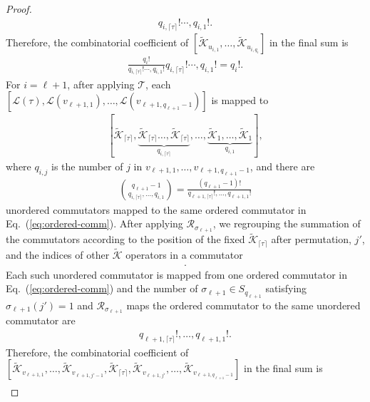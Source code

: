 \documentclass[11pt]{article}
\newcommand{\eq}[1]{(\ref{eq:#1})}
\newcommand{\mc}{\mathcal}
\begin{document}
\begin{proof}
\begin{align*}
    q_{i, \lceil\tau\rceil}! \cdots, q_{i,1}!.
\end{align*}
Therefore, the combinatorial coefficient of $[\tilde{\mc K}_{u_{i,1}},\ldots, \tilde{\mc K}_{u_{i,q_i}}]$ in the final sum is  \begin{align*}
    \frac{q_i!}{q_{i, \lceil\tau\rceil}! \cdots, q_{i,1}!}q_{i, \lceil\tau\rceil}! \cdots, q_{i,1}! = q_i!.
\end{align*}
For $i= \ell+1$, after applying $\mc T$, each $[\mc L(\tau), \mc L(v_{\ell+1,1}), \ldots, \mc L(v_{\ell+1,q_{\ell+1}-1})]$ is mapped to \begin{align}
\label{eq:ordered-comm}
    [\tilde{\mc K}_{\lceil \tau \rceil},\underbrace{\tilde{\mc K}_{\lceil\tau\rceil} \ldots,\tilde{\mc K}_{\lceil\tau\rceil}}_{q_{i,\lceil\tau\rceil}},   \ldots, \underbrace{\tilde{\mc K}_{1},  \ldots, \tilde{\mc K}_{1}}_{q_{i,1}}],
\end{align}
where $q_{i,j}$ is the number of $j$ in $v_{\ell+1, 1},\ldots, v_{\ell+1, q_{\ell+1}-1}$, and there are \begin{align*}
    \binom{q_{\ell+1}-1}{q_{i,\lceil \tau \rceil}, \ldots, q_{i,1}} = \frac{(q_{\ell+1}-1)!}{q_{\ell+1,\lceil \tau \rceil}!, \ldots, q_{\ell+1,1}!}
\end{align*} unordered commutators mapped to the same ordered commutator in Eq.~\eq{ordered-comm}. After applying $\mc R_{\sigma_{\ell+1}}$, we regrouping the summation of the commutators according to the position of the fixed $\tilde{\mc K}_{\lceil \tau \rceil}$ after permutation, $j'$, and the indices of other $\tilde{\mc K}$ operators in a commutator \begin{align*}
    [\tilde{\mc K}_{v_{\ell+1,1}}, \ldots,\tilde{\mc K}_{\lceil\tau\rceil}, \ldots, \tilde{\mc K}_{v_{\ell+1,q_{\ell+1}-1}}].
\end{align*} Each such unordered commutator is mapped from one ordered commutator in Eq.~\eq{ordered-comm} and the number of $\sigma_{\ell+1}\in S_{q_{\ell+1}}$ satisfying $\sigma_{\ell+1}(j')=1$ and $\mc R_{\sigma_{\ell+1}}$ maps the ordered commutator to the same unordered commutator are \begin{align*}
    q_{\ell+1,\lceil \tau \rceil}!, \ldots, q_{\ell+1,1}!.
\end{align*}
Therefore, the combinatorial coefficient of $[\tilde{\mc K}_{v_{\ell+1,1}}, \ldots, \tilde{\mc K}_{v_{\ell+1,j'-1}},\tilde{\mc K}_{\lceil\tau\rceil},\tilde{\mc K}_{v_{\ell+1,j'}}, \ldots, \tilde{\mc K}_{v_{\ell+1,q_{\ell+1}-1}}]$ in the final sum is \begin{align*}

\end{align*}
\end{proof}
\end{document}
